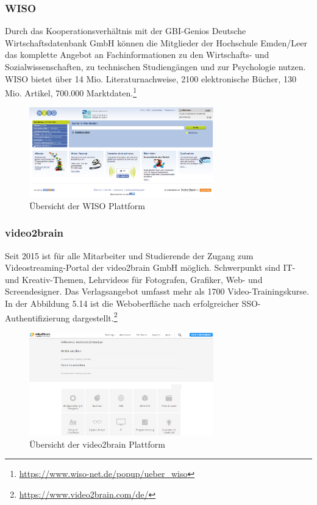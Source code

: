 \subsubsection{WISO}
Durch das Kooperationsverhältnis mit der GBI-Genios Deutsche Wirtschaftsdatenbank GmbH können die Mitglieder der Hochschule Emden/Leer das komplette Angebot an Fachinformationen zu den Wirtschafts- und Sozialwissenschaften, zu technischen Studiengängen und zur Psychologie  nutzen. WISO bietet über 14 Mio. Literaturnachweise, 2100 elektronische Bücher, 130 Mio. Artikel, 700.000 Marktdaten.\footnote{\url{https://www.wiso-net.de/popup/ueber_wiso}}

\begin{figure}[h!]
	\centering
	\includegraphics[width=8cm]{kapitel/gruppe2/bilder/wiso_plattform.png}
	\caption{Übersicht der WISO Plattform}
	\label{fig_wiso_plattform.png}
\end{figure}

\subsubsection{video2brain}
Seit 2015 ist für alle Mitarbeiter und Studierende der Zugang zum Videostreaming-Portal der video2brain GmbH möglich. Schwerpunkt sind IT- und Kreativ-Themen, Lehrvideos für Fotografen, Grafiker, Web- und Screendesigner. Das Verlagsangebot umfasst mehr als 1700 Video-Trainingskurse. In der Abbildung 5.14 ist die Weboberfläche nach erfolgreicher SSO-Authentifizierung dargestellt.\footnote{\url{https://www.video2brain.com/de/}}

\begin{figure}[h!]
	\centering
	\includegraphics[width=8cm]{kapitel/gruppe2/bilder/video2brain_suche}
	\caption{Übersicht der video2brain Plattform}
	\label{fig_video2brain_suchergebnis}
\end{figure}

